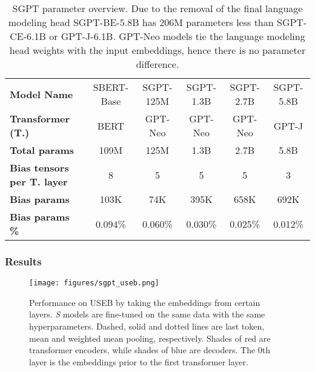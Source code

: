 \documentclass{article}
\begin{document}
\begin{table*}[t]
    \centering\small
    \begin{tabular}{lccccc}
    \toprule
    \textbf{Model Name} & SBERT-Base & SGPT-125M & SGPT-1.3B & SGPT-2.7B & SGPT-5.8B
    \\
    \textbf{Transformer (T.)} & BERT & GPT-Neo & GPT-Neo & GPT-Neo & GPT-J
    \\
    \textbf{Total params} & 109M & 125M & 1.3B & 2.7B & 5.8B
\\
    \textbf{Bias tensors per T. layer} & 8 & 5 & 5 & 5 & 3
\\
    \textbf{Bias params} & 103K & 74K & 395K & 658K & 692K
\\
    \textbf{Bias params \%} & 0.094\% & 0.060\% & 0.030\% & 0.025\% & 0.012\%
\\
    \bottomrule
    \end{tabular}
\caption{SGPT parameter overview. Due to the removal of the final language modeling head SGPT-BE-5.8B has 206M parameters less than SGPT-CE-6.1B or GPT-J-6.1B. GPT-Neo models tie the language modeling head weights with the input embeddings, hence there is no parameter difference.}
\label{tab:bias}
\end{table*}



\subsubsection{Results}\label{sec:bisymres}



\begin{figure*}[t]
    \centering
    \small
    \begin{center}
        \texttt{[image: figures/sgpt\_useb.png]}
        \caption{Performance on USEB \cite{wang2021tsdae} by taking the embeddings from certain layers. \textit{S} models are fine-tuned on the same data with the same hyperparameters. Dashed, solid and dotted lines are last token, mean and weighted mean pooling, respectively. Shades of red are transformer encoders, while shades of blue are decoders. The 0th layer is the embeddings prior to the first transformer layer.}
        \label{fig:sgptuseb}
    \end{center}
\end{figure*}
\end{document}
